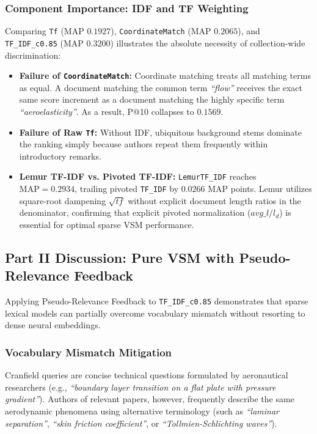 \documentclass[10pt, a4paper]{article}
\begin{document}
\subsubsection{Component Importance: IDF and TF Weighting}
Comparing \texttt{Tf} (MAP $0.1927$), \texttt{CoordinateMatch} (MAP $0.2065$), and \texttt{TF\_IDF\_c0.85} (MAP $0.3200$) illustrates the absolute necessity of collection-wide discrimination:
\begin{itemize}[noitemsep,topsep=2pt]
    \item \textbf{Failure of \texttt{CoordinateMatch}:} Coordinate matching treats all matching terms as equal. A document matching the common term \textit{``flow''} receives the exact same score increment as a document matching the highly specific term \textit{``aeroelasticity''}. As a result, P@10 collapses to $0.1569$.
    \item \textbf{Failure of Raw \texttt{Tf}:} Without IDF, ubiquitous background stems dominate the ranking simply because authors repeat them frequently within introductory remarks.
    \item \textbf{Lemur TF-IDF vs. Pivoted TF-IDF:} \texttt{LemurTF\_IDF} reaches $\text{MAP} = 0.2934$, trailing pivoted \texttt{TF\_IDF} by $0.0266$ MAP points. Lemur utilizes square-root dampening $\sqrt{tf}$ without explicit document length ratios in the denominator, confirming that explicit pivoted normalization ($avg\_l / l_d$) is essential for optimal sparse VSM performance.
\end{itemize}

\subsection{Part II Discussion: Pure VSM with Pseudo-Relevance Feedback}
\label{sec:disc_part2}

Applying Pseudo-Relevance Feedback to \texttt{TF\_IDF\_c0.85} demonstrates that sparse lexical models can partially overcome vocabulary mismatch without resorting to dense neural embeddings.

\subsubsection{Vocabulary Mismatch Mitigation}
Cranfield queries are concise technical questions formulated by aeronautical researchers (e.g., \textit{``boundary layer transition on a flat plate with pressure gradient''}). Authors of relevant papers, however, frequently describe the same aerodynamic phenomena using alternative terminology (such as \textit{``laminar separation''}, \textit{``skin friction coefficient''}, or \textit{``Tollmien-Schlichting waves''}). 
\end{document}

